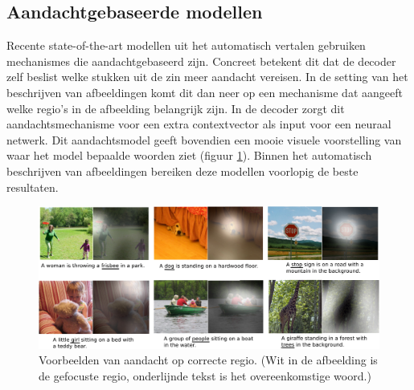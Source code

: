 \subsection{Aandachtgebaseerde modellen}
Recente state-of-the-art  modellen uit het automatisch vertalen gebruiken mechanismes die aandachtgebaseerd zijn. Concreet betekent dit dat de decoder zelf beslist welke stukken uit de zin meer aandacht vereisen.
In de setting van het beschrijven van afbeeldingen komt dit dan neer op een mechanisme dat aangeeft welke regio's in de afbeelding belangrijk zijn. In de decoder zorgt dit aandachtsmechanisme voor een extra contextvector als input voor een neuraal netwerk. Dit aandachtsmodel geeft bovendien een mooie visuele voorstelling van waar het model bepaalde woorden ziet (figuur \ref{fig:attention-example}). Binnen het automatisch beschrijven van afbeeldingen bereiken deze modellen\cite{Xu2015,Jin2015} voorlopig de beste resultaten.

\begin{figure}[tb]
	\centering
	\includegraphics[width=\linewidth]{Images/good_Xu.pdf}
	\caption{Voorbeelden van aandacht op correcte regio. (Wit in de afbeelding is de gefocuste regio, onderlijnde tekst is het overeenkomstige woord.)\cite{Xu2015}}
	\label{fig:attention-example}
\end{figure}

